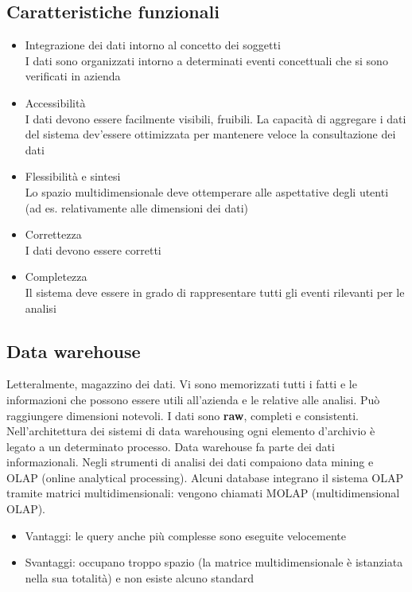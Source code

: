 \subsection{Caratteristiche
funzionali}\label{caratteristiche-funzionali}

\begin{itemize}

\item
  Integrazione dei dati intorno al concetto dei soggetti\\
  I dati sono organizzati intorno a determinati eventi concettuali che
  si sono verificati in azienda
\item
  Accessibilit\`a\\
  I dati devono essere facilmente visibili, fruibili. La capacit\`a di
  aggregare i dati del sistema dev'essere ottimizzata per mantenere
  veloce la consultazione dei dati
\item
  Flessibilit\`a e sintesi\\
  Lo spazio multidimensionale deve ottemperare alle aspettative degli
  utenti (ad es. relativamente alle dimensioni dei dati)
\item
  Correttezza\\
  I dati devono essere corretti
\item
  Completezza\\
  Il sistema deve essere in grado di rappresentare tutti gli eventi
  rilevanti per le analisi
\end{itemize}

\subsection{Data warehouse}\label{data-warehouse}

Letteralmente, magazzino dei dati. Vi sono memorizzati tutti i fatti e
le informazioni che possono essere utili all'azienda e le relative alle analisi.
Pu\`o raggiungere dimensioni notevoli. I dati sono \textbf{raw}, completi e consistenti.\\
Nell'architettura dei sistemi di data warehousing ogni elemento
d'archivio \`e legato a un determinato processo. Data warehouse fa parte
dei dati informazionali. Negli strumenti di analisi dei dati compaiono
data mining e OLAP (online analytical processing). Alcuni database integrano il sistema OLAP tramite matrici multidimensionali: vengono chiamati MOLAP (multidimensional OLAP).

\begin{itemize}

\item
  Vantaggi: le query anche pi\`u complesse sono eseguite velocemente
\item
  Svantaggi: occupano troppo spazio (la matrice multidimensionale \`e
  istanziata nella sua totalit\`a) e non esiste alcuno standard
\end{itemize}

